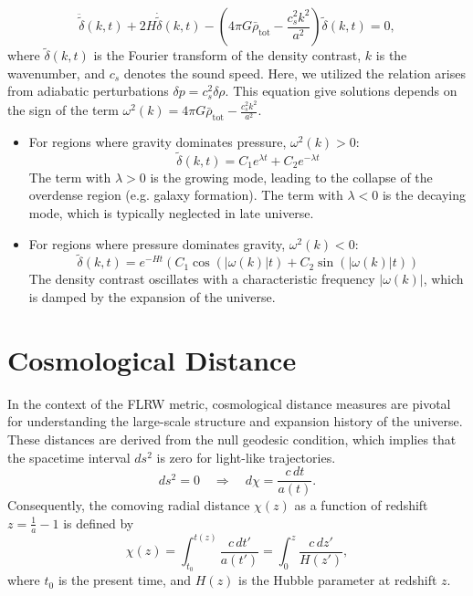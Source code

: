 \begin{equation}
    \ddot{\tilde{\delta}}(k, t) + 2H \dot{\tilde{\delta}}(k, t) - \left( 4\pi G \bar{\rho}_\mathrm{tot} - \frac{c_s^2 k^2}{a^2} \right) \tilde{\delta}(k, t) = 0,
\end{equation}
where \( \tilde{\delta}(k, t) \) is the Fourier transform of the density contrast, \( k \) is the wavenumber, and \( c_s \) denotes the sound speed.
Here, we utilized the relation arises from adiabatic perturbations \( \delta p = c_s^2 \delta \rho \).
This equation give solutions depends on the sign of the term $\omega^2(k) = 4\pi G \bar{\rho}_\mathrm{tot} - \frac{c_s^2 k^2}{a^2}$. 
\begin{itemize}
    \item For regions where gravity dominates pressure, \( \omega^2(k) > 0 \):
    \begin{equation}
        \tilde{\delta}(k, t) = C_1 e^{\lambda t} + C_2 e^{-\lambda t}
        \label{eq:delta_growing_mode}
    \end{equation}
    The term with \( \lambda > 0 \) is the growing mode, leading to the collapse of the overdense region (e.g. galaxy formation). The term with \( \lambda < 0 \) is the decaying mode, which is typically neglected in late universe.
    \item For regions where pressure dominates gravity, \( \omega^2(k) < 0 \):
    \begin{equation}
        \tilde{\delta}(k, t) = e^{-Ht} \left( C_1 \cos{\left( |\omega(k)| t \right)} + C_2 \sin{\left(|\omega(k)| t \right)} \right)
        \label{eq:delta_oscillatory_mode}
    \end{equation}
    The density contrast oscillates with a characteristic frequency \( |\omega(k)| \), which is damped by the expansion of the universe. 
\end{itemize}

\section{Cosmological Distance}
In the context of the FLRW metric, cosmological distance measures are pivotal for understanding the large-scale structure and expansion history of the universe. These distances are derived from the null geodesic condition, which implies that the spacetime interval \( ds^2 \) is zero for light-like trajectories. 
\begin{equation}
    ds^2 = 0 \quad \Rightarrow \quad d\chi = \frac{c \, dt}{a(t)}.
    \label{eq:null_geodesic_condition}
\end{equation}
Consequently, the comoving radial distance \( \chi(z) \) as a function of redshift $z = \tfrac{1}{a} - 1$ is defined by
\begin{equation}
    \chi(z) = \int_{t_0}^{t(z)} \frac{c \, dt'}{a(t')} = \int_{0}^{z} \frac{c \, dz'}{H(z')},
    \label{eq:comoving_radial_distance}
\end{equation}
where \( t_0 \) is the present time, and \( H(z) \) is the Hubble parameter at redshift \( z \).

